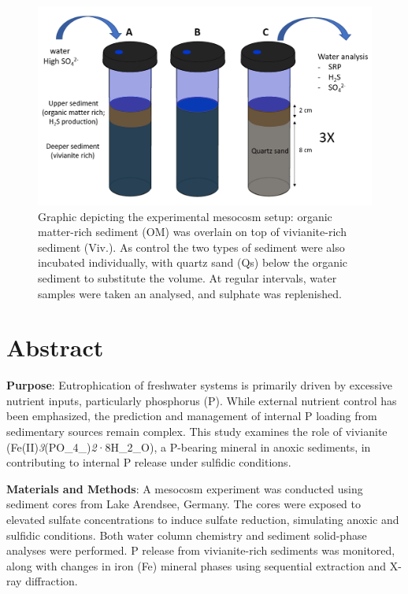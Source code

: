 \documentclass[12pt,twoside]{book}
\begin{document}
\begin{figure}

{\centering \includegraphics[width=0.7\linewidth]{figure/Setup_HS_Incubation_description} 

}

\caption{Graphic depicting the experimental mesocosm setup: organic matter-rich sediment (OM) was overlain on top of vivianite-rich sediment (Viv.). As control the two types of sediment were also incubated individually, with quartz sand (Qs) below the organic sediment to substitute the volume. At regular intervals, water samples were taken an analysed, and sulphate was replenished.}\label{fig:IncubationSetup}
\end{figure}

\section*{Abstract}\label{abstract}

\noindent \textbf{Purpose}: Eutrophication of freshwater systems is primarily driven by excessive nutrient inputs, particularly phosphorus (P). While external nutrient control has been emphasized, the prediction and management of internal P loading from sedimentary sources remain complex. This study examines the role of vivianite (Fe(II)\emph{3}(PO\_4\_)\emph{2}·8H\_2\_O), a P-bearing mineral in anoxic sediments, in contributing to internal P release under sulfidic conditions.

\noindent \textbf{Materials and Methods}: A mesocosm experiment was conducted using sediment cores from Lake Arendsee, Germany. The cores were exposed to elevated sulfate concentrations to induce sulfate reduction, simulating anoxic and sulfidic conditions. Both water column chemistry and sediment solid-phase analyses were performed. P release from vivianite-rich sediments was monitored, along with changes in iron (Fe) mineral phases using sequential extraction and X-ray diffraction.
\end{document}
